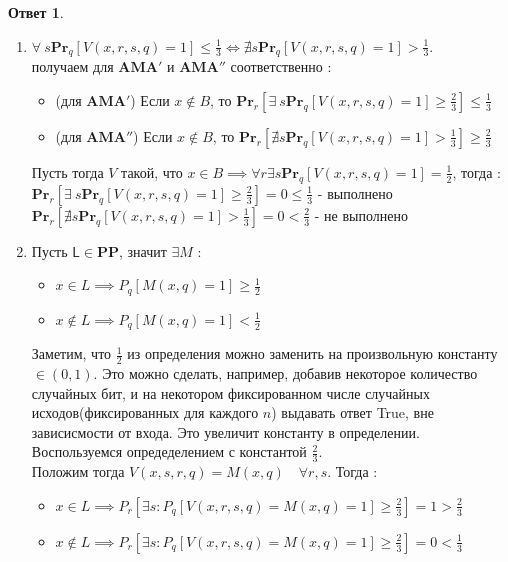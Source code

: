\documentclass[a4paper]{article}
\theoremstyle{plain}
\theoremstyle{definition}
\newtheorem*{answer}{Ответ}
\begin{document}
\begin{answer}
\item\begin{enumerate}
    \item $\forall\ s \mathbf{Pr}_q [V(x,r,s,q)=1] \leq \frac{1}{3}  \Leftrightarrow \nexists s
    \mathbf{Pr}_q [V(x,r,s,q)=1] > \frac{1}{3}$. \\ 
    получаем для $\mathbf{AMA'}$ и $\mathbf{AMA''}$ соответственно :
    \begin{itemize}
      \item (для $\mathbf{AMA'}$) Если $x \notin B$, то $\mathbf{Pr}_r[\exists\ s \mathbf{Pr}_q [V(x,r,s,q)=1] \geq \frac{2}{3}] \leq \frac{1}{3}$
      \item (для $\mathbf{AMA''}$) Если $x \notin B$, то $\mathbf{Pr}_r[\nexists s \mathbf{Pr}_q [V(x,r,s,q)=1] > \frac{1}{3}] \geq \frac{2}{3}$
  \end{itemize}
      Пусть тогда $V$ такой, что $x \in B \implies \forall r \exists s \mathbf{Pr}_q [V(x,r,s,q)=1] = \frac{1}{2}$, тогда : \\
      $\mathbf{Pr}_r[\exists\ s \mathbf{Pr}_q [V(x,r,s,q)=1] \geq \frac{2}{3}] = 0 \leq \frac{1}{3}$ - выполнено \\
      $\mathbf{Pr}_r[\nexists s \mathbf{Pr}_q [V(x,r,s,q)=1] > \frac{1}{3}] = 0  < \frac{2}{3}$ - не выполнено
    \item Пусть $\textsf{L} \in \mathbf{PP}$, значит $\exists M$ : 
    \begin{itemize}
        \item $x \in L \implies P_q [M(x,q) = 1] \geq \frac{1}{2}$
        \item $x \notin L \implies P_q [M(x,q) = 1] < \frac{1}{2}$
    \end{itemize}
    Заметим, что $\frac{1}{2}$ из определения можно заменить на произвольную константу $\in (0,1)$. Это можно сделать, например, добавив некоторое количество случайных бит, и на некотором фиксированном числе случайных исходов(фиксированных для каждого $n$) выдавать ответ \textsf{True}, вне зависисмости от входа. Это увеличит константу в определении. Воспользуемся опредеделением с константой $\frac{2}{3}$. \\
    Положим тогда $V(x,s,r,q) = M(x,q) \quad \forall r,s$. Тогда :
    \begin{itemize}
        \item $x \in L \implies P_r[ \exists s : P_q[V(x,r,s,q) = M(x,q) = 1] \geq \frac{2}{3}] = 1 > \frac{2}{3}$
        \item $x \notin L \implies P_r[\exists s : P_q[V(x,r,s,q) = M(x,q) = 1] \geq \frac{2}{3}] = 0 < \frac{1}{3}$

\end{itemize}
\end{enumerate}
\end{answer}
\end{document}
